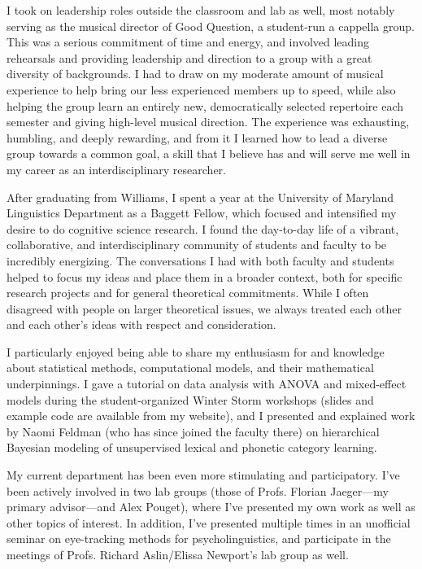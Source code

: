 \documentclass[12pt]{article}
\begin{document}
I took on leadership roles outside the classroom and lab as well, most notably serving as the musical director of Good Question, a student-run a cappella group.  This was a serious commitment of time and energy, and involved leading rehearsals and providing leadership and direction to a group with a great diversity of backgrounds.  I had to draw on my moderate amount of musical experience to help bring our less experienced members up to speed, while also helping the group learn an entirely new, democratically selected repertoire each semester and giving high-level musical direction.  The experience was exhausting, humbling, and deeply rewarding, and from it I learned how to lead a diverse group towards a common goal, a skill that I believe has and will serve me well in my career as an interdisciplinary researcher.




After graduating from Williams, I spent a year at the University of Maryland Linguistics Department as a Baggett Fellow, which focused and intensified my desire to do cognitive science research.  I found the day-to-day life of a vibrant, collaborative, and interdisciplinary community of students and faculty to be incredibly energizing.  The conversations I had with both faculty and students helped to focus my ideas and place them in a broader context, both for specific research projects and for general theoretical commitments.  While I often disagreed with people on larger theoretical issues, we always treated each other and each other's ideas with respect and consideration.  

I particularly enjoyed being able to share my enthusiasm for and knowledge about statistical methods, computational models, and their mathematical underpinnings.  I gave a tutorial on data analysis with ANOVA and mixed-effect models during the student-organized Winter Storm workshops (slides and example code are available from my website), and I presented and explained work by Naomi Feldman (who has since joined the faculty there) on hierarchical Bayesian modeling of unsupervised lexical and phonetic category learning.

My current department has been even more stimulating and participatory.  I've been actively involved in two lab groups (those of Profs. Florian Jaeger---my primary advisor---and Alex Pouget), where I've presented my own work as well as other topics of interest.  In addition, I've presented multiple times in an unofficial seminar on eye-tracking methods for psycholinguistics, and participate in the meetings of Profs. Richard Aslin/Elissa Newport's lab group as well.
\end{document}
